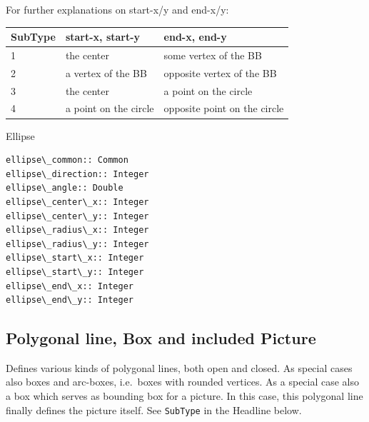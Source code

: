 \documentclass[10pt, a4paper, english]{article}%
\begin{document}
\noindent
For further explanations on start-x/y and end-x/y: \\
%
\begin{tabular}{lll}
\toprule
SubType  & start-x, start-y  & end-x, end-y \\
\midrule
\midrule
1 & the center            & some vertex of the BB \\
2 & a vertex of the BB    & opposite vertex of the BB \\
3 & the center            & a point on the circle \\
4 & a point on the circle & opposite point on the circle \\
\bottomrule
\end{tabular}

Ellipse	 

\begin{verbatim}
ellipse\_common:: Common
ellipse\_direction:: Integer
ellipse\_angle:: Double
ellipse\_center\_x:: Integer
ellipse\_center\_y:: Integer
ellipse\_radius\_x:: Integer
ellipse\_radius\_y:: Integer
ellipse\_start\_x:: Integer
ellipse\_start\_y:: Integer
ellipse\_end\_x:: Integer
ellipse\_end\_y:: Integer
\end{verbatim}

\subsection{Polygonal line, Box and included Picture}\label{subsec:polyline}

Defines various kinds of polygonal lines, both open and closed. 
As special cases also boxes and arc-boxes, i.e.~boxes with rounded vertices. 
As a special case also a box which serves as bounding box for a picture. 
In this case, this polygonal line finally defines the picture itself. 
See \texttt{SubType} in the Headline below. 
\end{document}
